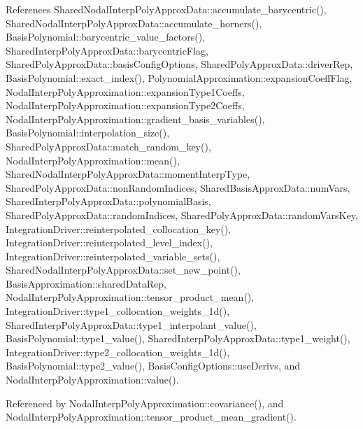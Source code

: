References Shared\+Nodal\+Interp\+Poly\+Approx\+Data\+::accumulate\+\_\+barycentric(), Shared\+Nodal\+Interp\+Poly\+Approx\+Data\+::accumulate\+\_\+horners(), Basis\+Polynomial\+::barycentric\+\_\+value\+\_\+factors(), Shared\+Interp\+Poly\+Approx\+Data\+::barycentric\+Flag, Shared\+Poly\+Approx\+Data\+::basis\+Config\+Options, Shared\+Poly\+Approx\+Data\+::driver\+Rep, Basis\+Polynomial\+::exact\+\_\+index(), Polynomial\+Approximation\+::expansion\+Coeff\+Flag, Nodal\+Interp\+Poly\+Approximation\+::expansion\+Type1\+Coeffs, Nodal\+Interp\+Poly\+Approximation\+::expansion\+Type2\+Coeffs, Nodal\+Interp\+Poly\+Approximation\+::gradient\+\_\+basis\+\_\+variables(), Basis\+Polynomial\+::interpolation\+\_\+size(), Shared\+Poly\+Approx\+Data\+::match\+\_\+random\+\_\+key(), Nodal\+Interp\+Poly\+Approximation\+::mean(), Shared\+Nodal\+Interp\+Poly\+Approx\+Data\+::moment\+Interp\+Type, Shared\+Poly\+Approx\+Data\+::non\+Random\+Indices, Shared\+Basis\+Approx\+Data\+::num\+Vars, Shared\+Interp\+Poly\+Approx\+Data\+::polynomial\+Basis, Shared\+Poly\+Approx\+Data\+::random\+Indices, Shared\+Poly\+Approx\+Data\+::random\+Vars\+Key, Integration\+Driver\+::reinterpolated\+\_\+collocation\+\_\+key(), Integration\+Driver\+::reinterpolated\+\_\+level\+\_\+index(), Integration\+Driver\+::reinterpolated\+\_\+variable\+\_\+sets(), Shared\+Nodal\+Interp\+Poly\+Approx\+Data\+::set\+\_\+new\+\_\+point(), Basis\+Approximation\+::shared\+Data\+Rep, Nodal\+Interp\+Poly\+Approximation\+::tensor\+\_\+product\+\_\+mean(), Integration\+Driver\+::type1\+\_\+collocation\+\_\+weights\+\_\+1d(), Shared\+Interp\+Poly\+Approx\+Data\+::type1\+\_\+interpolant\+\_\+value(), Basis\+Polynomial\+::type1\+\_\+value(), Shared\+Interp\+Poly\+Approx\+Data\+::type1\+\_\+weight(), Integration\+Driver\+::type2\+\_\+collocation\+\_\+weights\+\_\+1d(), Basis\+Polynomial\+::type2\+\_\+value(), Basis\+Config\+Options\+::use\+Derivs, and Nodal\+Interp\+Poly\+Approximation\+::value().



Referenced by Nodal\+Interp\+Poly\+Approximation\+::covariance(), and Nodal\+Interp\+Poly\+Approximation\+::tensor\+\_\+product\+\_\+mean\+\_\+gradient().

